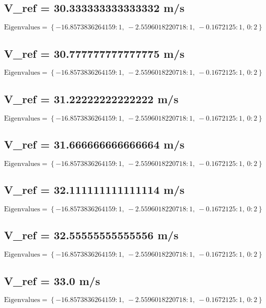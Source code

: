 \documentclass{article}
\begin{document}
\subsection*{V_ref = 30.333333333333332 m/s}
\begin{equation}
\text{Eigenvalues} = \left\{ -16.8573836264159 : 1, \  -2.5596018220718 : 1, \  -0.1672125 : 1, \  0 : 2\right\}
\end{equation}
\subsection*{V_ref = 30.777777777777775 m/s}
\begin{equation}
\text{Eigenvalues} = \left\{ -16.8573836264159 : 1, \  -2.5596018220718 : 1, \  -0.1672125 : 1, \  0 : 2\right\}
\end{equation}
\subsection*{V_ref = 31.22222222222222 m/s}
\begin{equation}
\text{Eigenvalues} = \left\{ -16.8573836264159 : 1, \  -2.5596018220718 : 1, \  -0.1672125 : 1, \  0 : 2\right\}
\end{equation}
\subsection*{V_ref = 31.666666666666664 m/s}
\begin{equation}
\text{Eigenvalues} = \left\{ -16.8573836264159 : 1, \  -2.5596018220718 : 1, \  -0.1672125 : 1, \  0 : 2\right\}
\end{equation}
\subsection*{V_ref = 32.111111111111114 m/s}
\begin{equation}
\text{Eigenvalues} = \left\{ -16.8573836264159 : 1, \  -2.5596018220718 : 1, \  -0.1672125 : 1, \  0 : 2\right\}
\end{equation}
\subsection*{V_ref = 32.55555555555556 m/s}
\begin{equation}
\text{Eigenvalues} = \left\{ -16.8573836264159 : 1, \  -2.5596018220718 : 1, \  -0.1672125 : 1, \  0 : 2\right\}
\end{equation}
\subsection*{V_ref = 33.0 m/s}
\begin{equation}
\text{Eigenvalues} = \left\{ -16.8573836264159 : 1, \  -2.5596018220718 : 1, \  -0.1672125 : 1, \  0 : 2\right\}
\end{equation}
\end{document}
